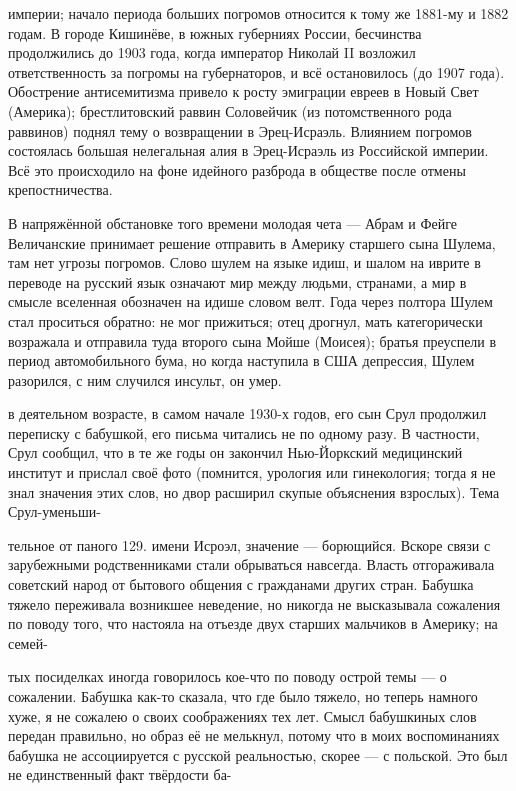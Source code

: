 \label{126-1}
империи; начало периода больших погромов относится к тому же 1881-му и 1882 годам. В городе Кишинёве, в южных губерниях России, бесчинства продолжились до 1903 года, когда император Николай II возложил ответственность за погромы на губернаторов, и всё остановилось (до 1907 года). Обострение антисемитизма привело к росту эмиграции евреев в Новый Свет (Америка); брестлитовский раввин Соловейчик (из потомственного рода раввинов) поднял тему о возвращении в Эрец-Исраэль. Влиянием погромов состоялась большая нелегальная алия в Эрец-Исраэль из Российской империи. Всё это происходило на фоне идейного разброда в обществе после отмены крепостничества.

\label{127-1}
В напряжённой обстановке того времени молодая чета — Абрам и Фейге Величанские принимает решение отправить в Америку старшего сына Шулема, там нет угрозы погромов. Слово шулем на языке идиш, и шалом на иврите в переводе на русский язык означают мир между людьми, странами, а мир в смысле вселенная обозначен на идише словом велт. Года через полтора Шулем стал проситься обратно: не мог прижиться; отец дрогнул, мать категорически возражала и отправила туда второго сына Мойше (Моисея); братья преуспели в период автомобильного бума, но когда наступила в США депрессия, Шулем разорился, с ним случился инсульт, он умер.

\label{128-1}
в деятельном возрасте, в самом начале 1930-х годов, его сын Срул продолжил переписку с бабушкой, его письма читались не по одному разу. В частности, Срул сообщил, что в те же годы он закончил Нью-Йоркский медицинский институт и прислал своё фото (помнится, урология или гинекология; тогда я не знал значения этих слов, но двор расширил скупые объяснения взрослых). Тема Срул-уменьши-

\label{129-1}
тельное от паного 129. имени Исроэл, значение — борющийся. Вскоре связи с зарубежными родственниками стали обрываться навсегда. Власть отгораживала советский народ от бытового общения с гражданами других стран. Бабушка тяжело переживала возникшее неведение, но никогда не высказывала сожаления по поводу того, что настояла на отъезде двух старших мальчиков в Америку; на семей-

\label{130-1}
тых посиделках иногда говорилось кое-что по поводу острой темы — о сожалении. Бабушка как-то сказала, что где было тяжело, но теперь намного хуже, я не сожалею о своих соображениях тех лет. Смысл бабушкиных слов передан правильно, но образ её не мелькнул, потому что в моих воспоминаниях бабушка не ассоциируется с русской реальностью, скорее — с польской. Это был не единственный факт твёрдости ба-

